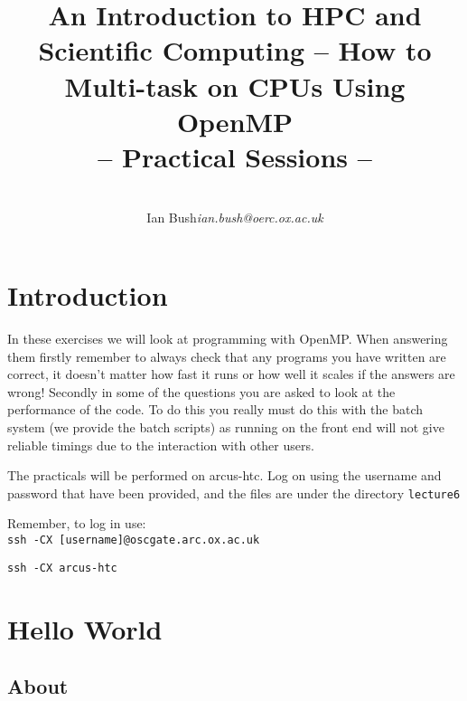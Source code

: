 \documentclass[a4paper, 12pt]{article}
\title{{\Huge\bf An Introduction to HPC and Scientific Computing -- How to Multi-task on CPUs Using OpenMP} \\ {\huge -- Practical Sessions --}}
\date{}
\author{\bf
  \begin{tabular}{ll}
    Ian Bush   & {\em ian.bush@oerc.ox.ac.uk}
  \end{tabular}
}
\def \cc   {\tt }               %
\begin{document}
\maketitle

\vfill

\tableofcontents

\newpage


\section{Introduction}
\label{Introduction}

In these exercises we will look at programming with OpenMP. When answering them firstly
remember to always check that any programs you have written are correct, it doesn't matter
how fast it runs or how well it scales if the answers are wrong! Secondly in some of the
questions you are asked to look at the performance of the code. To do this you really
must do this with the batch system (we provide the batch scripts) as running on the front
end will not give reliable timings due to the interaction with other users.

The practicals will be performed on arcus-htc. Log on using the username and password that have been provided,
and the files are under the directory {\cc lecture6}

Remember, to log in use: \\
{\cc ssh -CX [username]@oscgate.arc.ox.ac.uk}

{\cc ssh -CX arcus-htc}



\section{Hello World}
\label{basics}

\subsection*{About}
\end{document}
